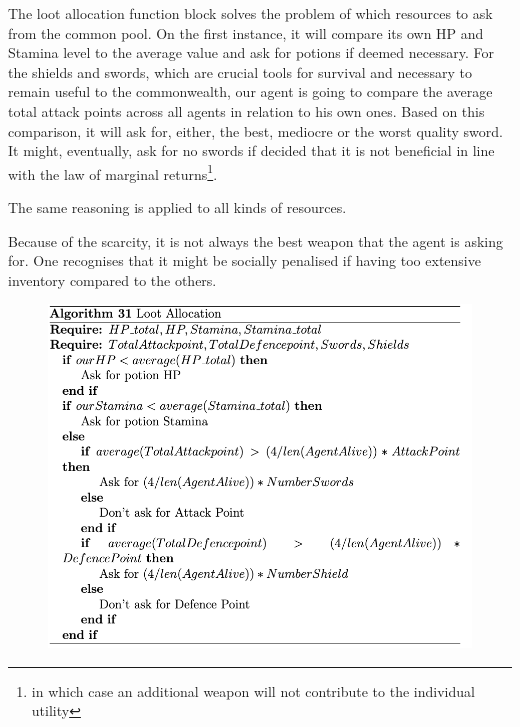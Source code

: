The loot allocation function block solves the problem of which resources to ask from the common pool. On the first instance, it will compare its own HP and Stamina level to the average value and ask for potions if deemed necessary. For the shields and swords, which are crucial tools for survival and necessary to remain useful to the commonwealth, our agent is going to compare the average total attack points across all agents in relation to his own ones. Based on this comparison, it will ask for, either, the best, mediocre or the worst quality sword. It might, eventually, ask for no swords if decided that it is not beneficial in line with the law of marginal returns\footnote{in which case an additional weapon will not contribute to the individual utility}.

The same reasoning is applied to all kinds of resources.

Because of the scarcity, it is not always the best weapon that the agent is asking for. One recognises that it might be socially penalised if having too extensive inventory compared to the others.


\begin{figure}[htb]
    \centering
    \includegraphics[scale=0.7]{006_team_3_agent_design/FIGS/Algo31.png}
    \label{fig:algo31}
\end{figure}

